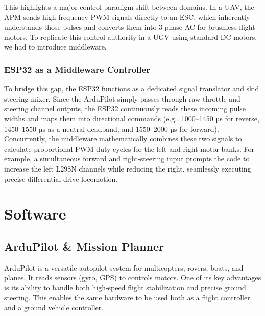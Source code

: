 \documentclass[conference]{IEEEtran}
\begin{document}
This highlights a major control paradigm shift between domains. In a UAV, the APM sends high-frequency PWM signals directly to an ESC, which inherently understands those pulses and converts them into 3-phase AC for brushless flight motors. To replicate this control authority in a UGV using standard DC motors, we had to introduce middleware.

\subsubsection{ESP32 as a Middleware Controller}
To bridge this gap, the ESP32 functions as a dedicated signal translator and skid steering mixer. Since the ArduPilot simply passes through raw throttle and steering channel outputs, the ESP32 continuously reads these incoming pulse widths and maps them into directional commands (e.g., 1000–1450 µs for reverse, 1450–1550 µs as a neutral deadband, and 1550–2000 µs for forward). Concurrently, the middleware mathematically combines these two signals to calculate proportional PWM duty cycles for the left and right motor banks. For example, a simultaneous forward and right-steering input prompts the code to increase the left L298N channels while reducing the right, seamlessly executing precise differential drive locomotion.



\section{Software}
\subsection{ArduPilot \& Mission Planner}
ArduPilot\cite{ardupilot} is a versatile autopilot system for multicopters, rovers, boats, and planes. It reads sensors (gyro, GPS) to controls motors. One of its key advantages is its ability to handle both high-speed flight stabilization and precise ground steering. This enables the same hardware to be used both as a flight controller and a ground vehicle controller.
\end{document}
